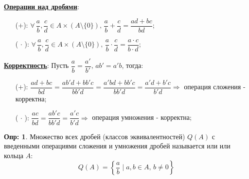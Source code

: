 \documentclass[12pt]{article}
\theoremstyle{definition}
\newtheorem{defn}{Опр:}
\begin{document}
\textbf{\uline{Операции над дробями}}:
\begin{enumerate}
	\item[($+$):] $\forall \, \dfrac{a}{b}, \dfrac{c}{d} \in A \times \left(A\setminus \{0\}\right), \, \dfrac{a}{b} + \dfrac{c}{d} = \dfrac{ad + bc}{bd}$;
	\item[($\, \cdot\, $):] $\forall \,\dfrac{a}{b}, \dfrac{c}{d} \in A \times \left(A\setminus \{0\}\right), \, \dfrac{a}{b}{\cdot}\dfrac{c}{d} = \dfrac{a{\cdot}c}{b{\cdot}d}$;
\end{enumerate}
\textbf{\uline{Корректность}}: Пусть $\dfrac{a}{b} = \dfrac{a'}{b'}, \, ab' = a'b$, тогда: 
\begin{enumerate}
	\item[($+$):] $\dfrac{ad + bc}{bd} = \dfrac{ab'd + bb'c}{bb'd} = \dfrac{a'bd + bb'c}{bb'd} = \dfrac{a'd + b'c}{b'd} \Rightarrow$ операция сложения - корректна;
	\item[($\, \cdot\, $):] $\dfrac{ac}{bd} = \dfrac{ab'c}{bb'd} = \dfrac{a'c}{b'd} \Rightarrow$ операция умножения - корректна;
\end{enumerate}

\begin{defn}
	Множество всех дробей (классов эквивалентностей) $Q(A)$ с введенными операциями сложения и умножения дробей называется  или  или  кольца $A$:
	$$
		Q(A) = \left\{\dfrac{a}{b}\mid a,b \in A, \, b \neq 0\right\}
	$$
\end{defn}
\end{document}
